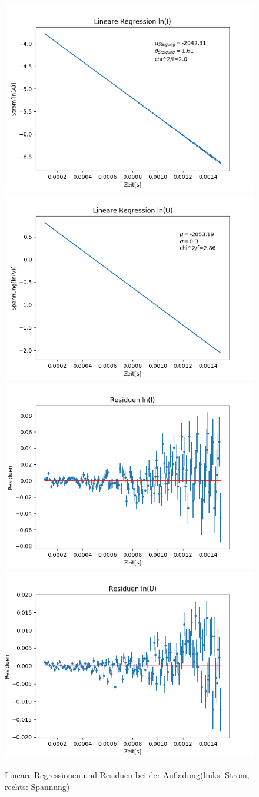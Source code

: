 \documentclass[12pt,a4paper]{article}
\begin{document}
\begin{figure}
\begin{center}
\includegraphics[width=0.49\linewidth]{Bilder/Kondensator_auf_linI}
\includegraphics[width=0.49\linewidth]{Bilder/Kondensator_auf_linU}
\includegraphics[width=0.49\linewidth]{Bilder/Kondensator_auf_resI}
\includegraphics[width=0.49\linewidth]{Bilder/Kondensator_auf_resU}
\caption[Rohdaten logarith. A]{Lineare Regressionen und Residuen bei der Aufladung(links: Strom, rechts: Spannung)}
\label{fig:linAuf}
\end{center}
\end{figure}
\end{document}
